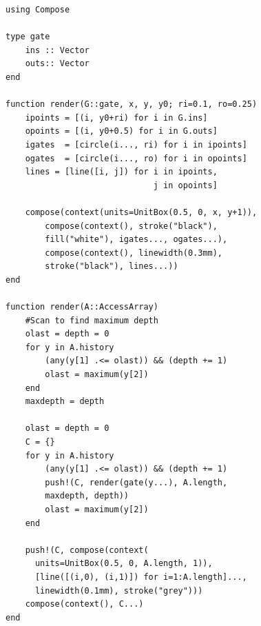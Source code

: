 \documentclass{sig-alternate}
\begin{document}
\begin{verbatim}
using Compose

type gate
    ins :: Vector
    outs:: Vector
end

function render(G::gate, x, y, y0; ri=0.1, ro=0.25)
    ipoints = [(i, y0+ri) for i in G.ins]
    opoints = [(i, y0+0.5) for i in G.outs]
    igates  = [circle(i..., ri) for i in ipoints]
    ogates  = [circle(i..., ro) for i in opoints]
    lines = [line([i, j]) for i in ipoints,
                              j in opoints]

    compose(context(units=UnitBox(0.5, 0, x, y+1)),
        compose(context(), stroke("black"),
	    fill("white"), igates..., ogates...),
        compose(context(), linewidth(0.3mm),
	    stroke("black"), lines...))
end

function render(A::AccessArray)
    #Scan to find maximum depth
    olast = depth = 0
    for y in A.history
        (any(y[1] .<= olast)) && (depth += 1)
        olast = maximum(y[2])
    end
    maxdepth = depth
    
    olast = depth = 0
    C = {}
    for y in A.history
        (any(y[1] .<= olast)) && (depth += 1)
        push!(C, render(gate(y...), A.length,
	    maxdepth, depth))
        olast = maximum(y[2])
    end
    
    push!(C, compose(context(
      units=UnitBox(0.5, 0, A.length, 1)),
      [line([(i,0), (i,1)]) for i=1:A.length]...,
      linewidth(0.1mm), stroke("grey")))
    compose(context(), C...)
end
\end{verbatim}
\end{document}
